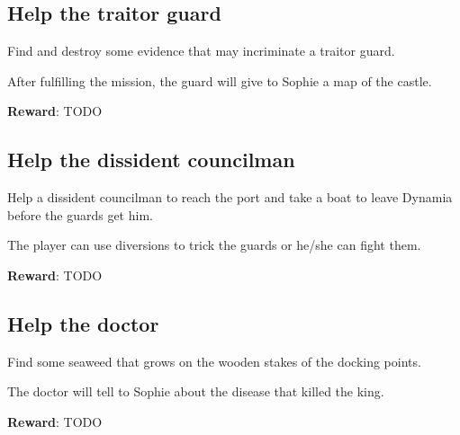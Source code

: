 \subsection{Help the traitor guard}
Find and destroy some evidence that may incriminate a traitor guard.

After fulfilling the mission, the guard will give to Sophie a map of the castle.

\textbf{Reward}: TODO


\subsection{Help the dissident councilman}
Help a dissident councilman to reach the port and take a boat to leave Dynamia before the guards get him.

The player can use diversions to trick the guards or he/she can fight them.

\textbf{Reward}: TODO


\subsection{Help the doctor}
Find some seaweed that grows on the wooden stakes of the docking points.

The doctor will tell to Sophie about the disease that killed the king.

\textbf{Reward}: TODO

